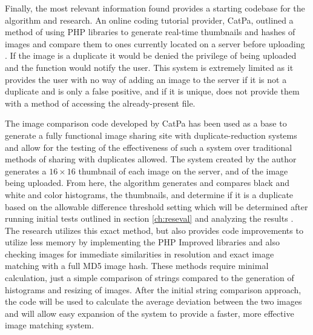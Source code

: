 Finally, the most relevant information found provides a starting codebase for the algorithm and research. An online coding tutorial provider, CatPa, outlined a method of using PHP libraries to generate real-time thumbnails and hashes of images and compare them to ones currently located on a server before uploading \cite{catpa:gdcode}. If the image is a duplicate it would be denied the privilege of being uploaded and the function would notify the user. This system is extremely limited as it provides the user with no way of adding an image to the server if it is not a duplicate and is only a false positive, and if it is unique, does not provide them with a method of accessing the already-present file.

The image comparison code developed by CatPa has been used as a base to generate a fully functional image sharing site with duplicate-reduction systems and allow for the testing of the effectiveness of such a system over traditional methods of sharing with duplicates allowed. The system created by the author \cite{catpa:gdcode} generates a $16\times 16$ thumbnail of each image on the server, and of the image being uploaded. From here, the algorithm generates and compares black and white and color histograms, the thumbnails, and determine if it is a duplicate based on the allowable difference threshold setting which will be determined after running initial tests outlined in section \ref{ch:reseval} and analyzing the results \cite{catpa:gdcode}. The research utilizes this exact method, but also provides code improvements to utilize less memory by implementing the PHP Improved libraries and also checking images for immediate similarities in resolution and exact image matching with a full MD5 image hash. These methods require minimal calculation, just a simple comparison of strings compared to the generation of histograms and resizing of images. After the initial string comparison approach, the code will be used to calculate the average deviation between the two images and will allow easy expansion of the system to provide a faster, more effective image matching system.